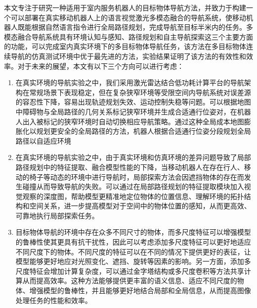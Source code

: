 本文专注于研究一种适用于室内服务机器人的目标物体导航方法，并致力于构建一个可以部署在真实移动机器人上的语言视觉激光多模态融合的导航系统，使移动机器人既能根据自然语言指令进行全局路径规划，完成导航至目标半米内的任务。多模态融合导航系统具有环境认知与感知、路径规划和自主导航探索这三个主要方面的功能，可以完成室内真实环境下的多目标物体导航任务，该方法在多目标物体连续导航的仿真测试环境中优于最先进的方法，实验结果证明了该方法的有效性和效率。对于未来的展望，本文有以下三个方向可以进行考虑：
\begin{enumerate}[topsep = 0 pt, itemsep= 0 pt, parsep=0pt, partopsep=0pt, leftmargin=44pt, itemindent=0pt, labelsep=6pt, label=(\arabic*)]
    \item 	在真实环境的导航实验之中，我们采用激光雷达结合低功耗计算平台的导航架构在常规场景下表现稳定，但在复杂狭窄环境等受限空间内导航系统对误差源的容忍性下降，容易出现轨迹规划失效、运动控制失稳等问题。可以根据地图中障碍物与全局路径的几何关系标记狭窄环境并生成合适通行位姿对，在机器人出入被标记的狭窄环境时自动切换相应导航策略。通过这种全局成本地图膨胀化以规划更安全的全局路径的方法，机器人根据合适通行位姿分段规划全局路径以自适应环境
    \item	在真实环境的导航实验之中，由于真实环境和仿真环境的差异问题导致了局部路径规划中的特征提取、融合模型性能的下降，当移动机器人在存在行人、移动的椅子等动态的环境中进行导航时，局部探索方法会因遮挡物体的存在而发生碰撞从而导致导航的失败。可以通过在局部路径规划的特征提取模块加入视觉观察的深度图，帮助模型更精准地定位物体的位置信息、理解环境的拓扑结构和空间关系，进一步提高模型对于空间中的物体位置的感知，从而更高效、可靠地执行局部探索任务。
    \item	目标物体导航的环境中存在众多不同尺寸的物体，而多尺度特征可以增强模型的鲁棒性使其更具有抗干扰性，因此可以考虑添加多尺度特征可以更好地适应不同尺度下的物体。不同尺度的特征可以在不同的情况下提供更好的表征，让模型能够更好地应对光照变化、遮挡、旋转等因素的影响。另一方面，添加多尺度特征会增加计算复杂度，可以通过金字塔结构或多尺度卷积等方法共享计算从而提高效率。这种方法能够提供更丰富的语义信息、适应不同尺度的物体、增强模型的鲁棒性，并且能够更好地结合局部和全局信息，从而提高图像处理任务的性能和效率。 
    
\end{enumerate}


